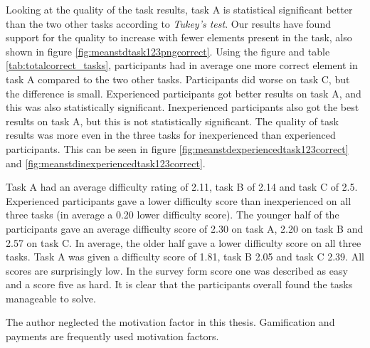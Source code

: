Looking at the quality of the task results, task A is statistical significant better than the two other tasks according to \textit{Tukey's test}. Our results have found support for the quality to increase with fewer elements present in the task, also shown in figure \ref{fig:meanstdtask123pngcorrect}. Using the figure and table \ref{tab:totalcorrect_tasks}, participants had in average one more correct element in task A compared to the two other tasks. Participants did worse on task C, but the difference is small. Experienced participants got better results on task A, and this was also statistically significant. Inexperienced participants also got the best results on task A, but this is not statistically significant. The quality of task results was more even in the three tasks for inexperienced than experienced participants. This can be seen in figure \ref{fig:meanstdexperiencedtask123correct} and \ref{fig:meanstdinexperiencedtask123correct}. 


Task A had an average difficulty rating of 2.11, task B of 2.14 and task C of 2.5. Experienced participants gave a lower difficulty score than inexperienced on all three tasks (in average a 0.20 lower difficulty score). The younger half of the participants gave an average difficulty score of 2.30 on task A, 2.20 on task B and 2.57 on task C. In average, the older half gave a lower difficulty score on all three tasks. Task A was given a difficulty score of 1.81, task B 2.05 and task C 2.39. All scores are surprisingly low. In the survey form score one was described as easy and a score five as hard. It is clear that the participants overall found the tasks manageable to solve. 

The author neglected the motivation factor in this thesis. Gamification and payments are frequently used motivation factors. 



